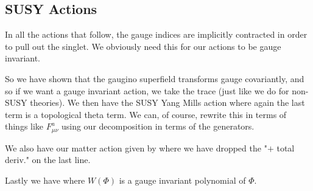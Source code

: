 \subsection{SUSY Actions}

\bnn 
    In all the actions that follow, the gauge indices are implicitly contracted in order to pull out the singlet. We obviously need this for our actions to be gauge invariant. 
\enn 

So we have shown that the gaugino superfield transforms gauge covariantly, and so if we want a gauge invariant action, we take the trace (just like we do for non-SUSY theories). We then have the SUSY Yang Mills action
\noindent where again the last term is a topological theta term. We can, of course, rewrite this in terms of things like $F_{\mu\nu}^a$ using our decomposition in terms of the generators. 

We also have our matter action given by
\noindent where we have dropped the "$+$ total deriv." on the last line.

Lastly we have
\noindent where $W(\Phi)$ is a gauge invariant polynomial of $\Phi$. 


